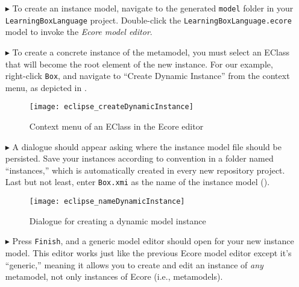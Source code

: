 \begin{itemize}

\item[$\blacktriangleright$] To create an instance model, navigate to the generated \texttt{model} folder in your \texttt{LearningBoxLanguage} project.
Double-click the \texttt{LearningBoxLa\-nguage.ecore} model to invoke  the \emph{Ecore model editor}. 

\vspace{0.5cm}

\item[$\blacktriangleright$] To create a concrete instance of the metamodel, you must select an EClass that will become the root element of the new instance.
For our example, right-click \texttt{Box}, and navigate to ``Create Dynamic Instance'' from the context menu, as depicted in .

\begin{figure}[htbp]
	\centering
  \texttt{[image: eclipse\_createDynamicInstance]}
	\caption{Context menu of an EClass in the Ecore editor}
	\label{fig:context_menu}
\end{figure}

\vspace{0.5cm}

\item[$\blacktriangleright$] A dialogue should appear asking where the instance model file should be persisted. Save your instances according to convention in a
folder named ``instances,'' which is automatically created in every new repository project. Last but not least, enter \texttt{Box.xmi} as the name of the
instance model ().

\vspace{0.5cm}

\begin{figure}[htbp]
	\centering
  \texttt{[image: eclipse\_nameDynamicInstance]}
	\caption{Dialogue for creating a dynamic model instance}
	\label{eclipse:store_dynamic_instance}
\end{figure}

\item[$\blacktriangleright$] Press \texttt{Finish}, and a generic model editor should open for your new instance model. This editor works just like the
previous Ecore model editor except it's ``generic,'' meaning it allows you to create and edit an instance of \emph{any} metamodel, not only instances of Ecore
(i.e., metamodels).


\end{itemize}
